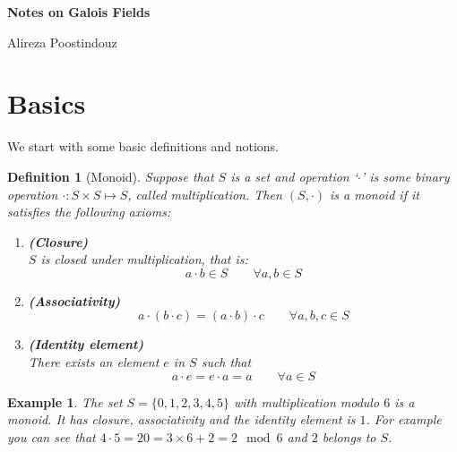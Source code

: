 \documentclass[12pt]{article}
\newtheorem{example}{Example}
\newtheorem{definition}{Definition}
\begin{document}
\begin{center}
\LARGE \textbf{Notes on Galois Fields} \\[0.5cm] 
\end{center}

\begin{center}
	\large {Alireza Poostindouz}
\end{center}


\section{Basics}

We start with some basic definitions and notions. 

\begin{definition}[Monoid]
	Suppose that $S$ is a set and operation `$\cdot$'  is some binary operation $\cdot : S \times S \mapsto S$, called multiplication. Then $(S,\cdot)$ is a \textit{monoid} if it satisfies the following axioms:
	\begin{enumerate}
		\item \textbf{(Closure)}\\
		$S$ is closed under multiplication, that is:
		$$a\cdot b \in S\qquad \forall a,b\in S$$
		\item \textbf{ (Associativity) }\\
		$$a\cdot \left(b\cdot c\right) =  \left(a\cdot b\right) \cdot c \qquad \forall a,b,c\in S$$
		\item \textbf{ (Identity element) }\\
		There exists an element $e$ in $S$ such that
		$$a\cdot e = e \cdot a = a \qquad \forall a \in S$$
	\end{enumerate}
\end{definition}

\begin{example}
	The set $S=\{0, 1, 2, 3, 4, 5\}$ with multiplication modulo $6$ is a monoid. It has closure, associativity and the identity element is $1$.
	For example you can see that $4\cdot 5 = 20 = 3\times 6 + 2 = 2 \mod 6$ and $2$ belongs to $S$. 
\end{example}
\end{document}
